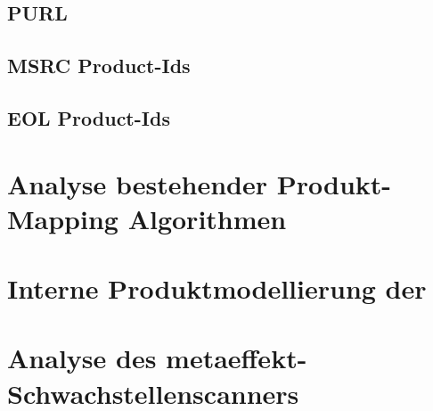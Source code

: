 \subsection{PURL}

\subsection{MSRC Product-Ids}

\subsection{EOL Product-Ids}


\section{Analyse bestehender Produkt-Mapping Algorithmen}



\section{Interne Produktmodellierung der \metaeffektlg}


\section{Analyse des metaeffekt-Schwachstellenscanners}
